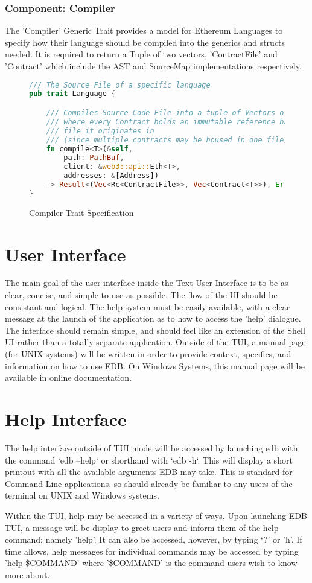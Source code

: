 \documentclass{report}
\begin{document}
    \subsubsection{Component: Compiler}
		The 'Compiler' Generic Trait provides a model for Ethereum Languages to specify how their language should be compiled into the generics and structs needed. It is required to return a Tuple of two vectors, 'ContractFile' and 'Contract' which include the AST and SourceMap implementations respectively.
\begin{figure}[!h]
    \begin{lstlisting}[language=Rust,basicstyle=\footnotesize]
/// The Source File of a specific language
pub trait Language {

	/// Compiles Source Code File into a tuple of Vectors of (ContractFile, Contract)
	/// where every Contract holds an immutable reference back to the
	/// file it originates in
	/// (since multiple contracts may be housed in one file)
	fn compile<T>(&self,
		path: PathBuf,
		client: &web3::api::Eth<T>,
		addresses: &[Address])
	-> Result<(Vec<Rc<ContractFile>>, Vec<Contract<T>>), Error> where T: Transport;
}
    \end{lstlisting}
    \caption{Compiler Trait Specification}
\end{figure}

\section{User Interface}
    The main goal of the user interface inside the Text-User-Interface is to be as clear, concise, and simple to use as possible. The flow of the UI should be consistant and logical. The help system must be easily available, with a clear message at the launch of the application as to how to access the 'help' dialogue. The interface should remain simple, and should feel like an extension of the Shell UI rather than a totally separate application. Outside of the TUI, a manual page (for UNIX systems) will be written in order to provide context, specifics, and information on how to use EDB. On Windows Systems, this manual page will be available in online documentation.

\section{Help Interface}
    The help interface outside of TUI mode will be accessed by launching edb with the command `edb --help` or shorthand with `edb -h`. This will display a short printout with all the available arguments EDB may take. This is standard for Command-Line applications, so should already be familiar to any users of the terminal on UNIX and Windows systems.


    Within the TUI, help may be accessed in a variety of ways. Upon launching EDB TUI, a message will be display to greet users and inform them of the help command; namely 'help'. It can also be accessed, however, by typing `?' or 'h'. If time allows, help messages for individual commands may be accessed by typing 'help \$COMMAND' where '\$COMMAND' is the command users wish to know more about.

\printglossary[title={Glossary | Index}]
\end{document}
